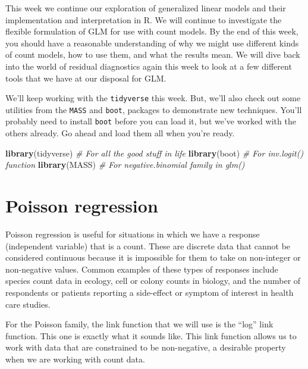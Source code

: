 \documentclass[
]{book}
\newenvironment{Shaded}{\begin{snugshade}}{\end{snugshade}}
\newcommand{\CommentTok}[1]{\textcolor[rgb]{0.56,0.35,0.01}{\textit{#1}}}
\newcommand{\KeywordTok}[1]{\textcolor[rgb]{0.13,0.29,0.53}{\textbf{#1}}}
\newcommand{\NormalTok}[1]{#1}
\begin{document}
This week we continue our exploration of generalized linear models and their implementation and interpretation in R. We will continue to investigate the flexible formulation of GLM for use with count models. By the end of this week, you should have a reasonable understanding of why we might use different kinds of count models, how to use them, and what the results mean. We will dive back into the world of residual diagnostics again this week to look at a few different tools that we have at our disposal for GLM.

We'll keep working with the \texttt{tidyverse} this week. But, we'll also check out some utilities from the \texttt{MASS} and \texttt{boot}, packages to demonstrate new techniques. You'll probably need to install \texttt{boot} before you can load it, but we've worked with the others already. Go ahead and load them all when you're ready.

\begin{Shaded}
\begin{Highlighting}[]
\KeywordTok{library}\NormalTok{(tidyverse) }\CommentTok{# For all the good stuff in life}
\KeywordTok{library}\NormalTok{(boot) }\CommentTok{# For inv.logit() function}
\KeywordTok{library}\NormalTok{(MASS) }\CommentTok{# For negative.binomial family in glm()}
\end{Highlighting}
\end{Shaded}

\hypertarget{poisson-regression}{%
\section{Poisson regression}\label{poisson-regression}}

Poisson regression is useful for situations in which we have a response (independent variable) that is a count. These are discrete data that cannot be considered continuous because it is impossible for them to take on non-integer or non-negative values. Common examples of these types of responses include species count data in ecology, cell or colony counts in biology, and the number of respondents or patients reporting a side-effect or symptom of interest in health care studies.

For the Poisson family, the link function that we will use is the ``log'' link function. This one is exactly what it sounds like. This link function allows us to work with data that are constrained to be non-negative, a desirable property when we are working with count data.
\end{document}
